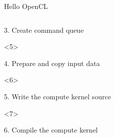 \documentclass[@BEAMER_OPTIONS@]{beamer}
\begin{document}
\begin{frame}[fragile]{Hello OpenCL}
\begin{columns}
\begin{column}[c]{0.7\textwidth}
\begin{onlyenv}
\begin{exampleblock}{3. Create command queue}
\begin{adjustbox}{width=0.75\textwidth, height=\textheight, keepaspectratio}
                        \begin{minipage}{\textwidth}
                            
                        \end{minipage}
                    \end{adjustbox}
                \end{exampleblock}
            \end{onlyenv}
            \begin{onlyenv}<5>
                \begin{exampleblock}{4. Prepare and copy input data}
                    \begin{adjustbox}{width=0.75\textwidth, height=\textheight, keepaspectratio}
                        \begin{minipage}{\textwidth}
                            
                        \end{minipage}
                    \end{adjustbox}
                \end{exampleblock}
            \end{onlyenv}
            \begin{onlyenv}<6>
                \begin{exampleblock}{5. Write the compute kernel source}
                    \begin{adjustbox}{width=0.75\textwidth, height=\textheight, keepaspectratio}
                        \begin{minipage}{\textwidth}
                            
                        \end{minipage}
                    \end{adjustbox}
                \end{exampleblock}
            \end{onlyenv}
            \begin{onlyenv}<7>
                \begin{exampleblock}{6. Compile the compute kernel}
                    \begin{adjustbox}{width=0.75\textwidth, height=\textheight, keepaspectratio}
                        \begin{minipage}{\textwidth}
                            

\end{minipage}
\end{adjustbox}
\end{exampleblock}
\end{onlyenv}
\end{column}
\end{columns}
\end{frame}
\end{document}
